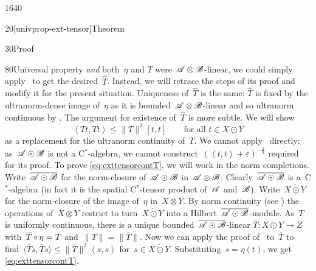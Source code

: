 \begin{parsec}{1640}
\begin{point}{20}[univprop-ext-tensor]{Theorem}
\begin{point}{30}{Proof}
\begin{point}{80}{Universal property}
    \emph{and} both~$\eta$ and $T$ were~$\mathscr{A} \otimes \mathscr{B}$-linear,
    we could simply apply~
    to get the desired~$\hat{T}$.
Instead, we will retrace the steps of its proof
    and modify it for the present situation.
Uniqueness of~$\hat{T}$ is the same:
    $\hat{T}$ is fixed by the ultranorm-dense image of~$\eta$
    as it is bounded~$\mathscr{A}\otimes\mathscr{B}$-linear
    and so ultranorm continuous by .
The argument for existence of~$\hat{T}$ is more subtle.
We will show
\begin{equation}\label{eq:exttensorcontT}
    \left<T t, T t\right> \leq \|T\|^2 [t,t]
        \qquad \text{for all~$t \in X \odot Y$}
\end{equation}
as a replacement for the ultranorm continuity of~$T$.
We cannot apply~ directly:
    as~$\mathscr{A} \odot \mathscr{B}$ is not a C$^*$-algebra,
    we cannot construct~$(\left<t,t\right>+\varepsilon)^{-\frac{1}{2}}$
    required for its proof.
To prove \eqref{eq:exttensorcontT}, we will work in the norm completions.
Write~$\overline{\mathscr{A} \odot \mathscr{B}}$
    for the norm-closure of~$\mathscr{A} \odot \mathscr{B}$ in~$\mathscr{A} \otimes \mathscr{B}$.
Clearly~$\overline{\mathscr{A} \odot \mathscr{B}}$
    is a~C$^*$-algebra
    (in fact it is the spatial C$^*$-tensor product of~$\mathscr{A}$ and~$\mathscr{B}$).
Write~$\overline{X \odot Y}$
    for the norm-closure of the image of~$\eta$ in~$X \otimes Y$.
By norm continuity
    (see )
    the operations of~$X \otimes Y$
    restrict to turn~$\overline{X \odot Y}$ into a
    Hilbert~$\overline{\mathscr{A} \odot \mathscr{B}}$-module.
As~$T$ is uniformly continuous,
    there is a unique bounded~$\overline{\mathscr{A}\odot\mathscr{B}}$-linear
    $\overline{T}\colon \overline{X\odot Y} \to Z$
    with~$\overline{T} \mathop{\circ} \eta = T$ and~$\|T\| = \|\overline{T}\|$.
Now we can apply the proof of~
    to~$\overline{T}$
    to find~$\langle \overline{T}s,\overline{T}s\rangle \leq
    \|\overline{T}\|^2\left<s,s\right>$
    for~$s \in \overline{X \odot Y}$.
Substituting~$s = \eta(t)$,
    we get \eqref{eq:exttensorcontT}.


\end{point}
\end{point}
\end{point}
\end{parsec}

